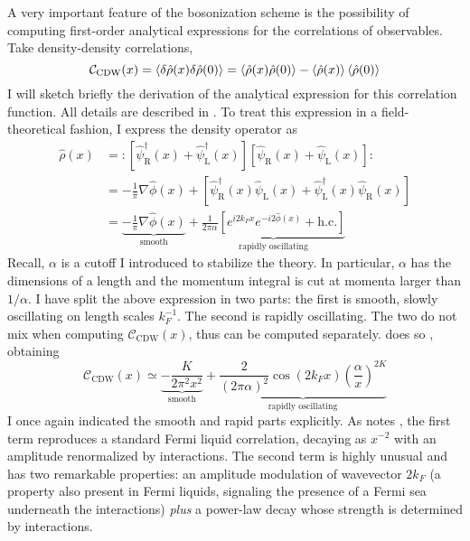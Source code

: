 A very important feature of the bosonization scheme is the possibility of computing first-order analytical expressions for the correlations of observables. Take density-density correlations,
\[
	\mathcal{C}_\mathrm{CDW}(x) = \ev{\delta \hat \rho(x) \delta \hat \rho(0)} = \ev{\hat \rho(x) \hat \rho(0)} - \ev{\hat \rho(x)} \ev{\hat \rho(0)}
\]
I will sketch briefly the derivation of the analytical expression for this correlation function. All details are described in \cite{giamarchi2003quantum, miranda2003introduction}. To treat this expression in a field-theoretical fashion, I express the density operator as
\[
	\begin{aligned}
		\hat \rho(x) &= \colon \left[
			\hat \psi_\mathrm{R}^\dagger(x) + \hat \psi_\mathrm{L}^\dagger(x)
		\right] \left[
			\hat \psi_\mathrm{R}(x) + \hat \psi_\mathrm{L}(x)
		\right] \colon \\
		&= - \frac{1}{\pi} \nabla \hat \phi(x) + \left[
			\hat \psi_\mathrm{R}^\dagger(x) \hat \psi_\mathrm{L}(x) + \hat \psi_\mathrm{L}^\dagger(x) \hat \psi_\mathrm{R}(x) 
		\right] \\
		&= \underbrace{
				- \frac{1}{\pi} \nabla \hat \phi(x)
			}_{\text{smooth}} + \underbrace{
				\frac{1}{2\pi\alpha} \left[
					e^{i 2k_F x} e^{-i 2 \hat \phi(x)}
					+ \mathrm{h.c.}
				\right]
			}_{\text{rapidly oscillating}}
	\end{aligned}
\]
Recall, $\alpha$ is a cutoff I introduced to stabilize the theory. In particular, $\alpha$ has the dimensions of a length and the momentum integral is cut at momenta larger than $1/\alpha$. I have split the above expression in two parts: the first is smooth, slowly oscillating on length scales $k_F^{-1}$. The second is rapidly oscillating. The two do not mix when computing $\mathcal{C}_\mathrm{CDW}(x)$, thus can be computed separately. \citeauthor{miranda2003introduction} does so \cite[Sec.~$\mathrm{XIV}.2$]{miranda2003introduction}, obtaining
\begin{equation}\label{eq:density-density-correlation-power-law}
	\mathcal{C}_\mathrm{CDW}(x) \simeq 
	\underbrace{
		- \frac{K}{2\pi^2 x^2}
	}_{\text{smooth}} +  \underbrace{
		\frac{2}{(2\pi\alpha)^2} \cos\left(2k_F x\right) \left(
	 		\frac{\alpha}{x}
		\right)^{2K}
	}_{\text{rapidly oscillating}}
\end{equation}
I once again indicated the smooth and rapid parts explicitly. As \citeauthor{giamarchi2003quantum} notes \cite[Sec.~2.2.2]{giamarchi2003quantum}, the first term reproduces a standard Fermi liquid correlation, decaying as $x^{-2}$ with an amplitude renormalized by interactions. The second term is highly unusual and has two remarkable properties: an amplitude modulation of wavevector $2k_F$ (a property also present in Fermi liquids, signaling the presence of a Fermi sea underneath the interactions) \textit{plus} a power-law decay whose strength is determined by interactions.

